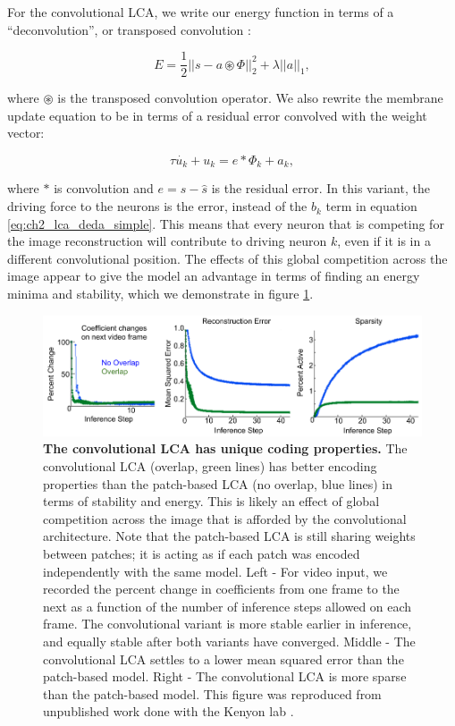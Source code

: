 For the convolutional LCA, we write our energy function in terms of a ``deconvolution'', or transposed convolution \parencite{zeiler2010deconvolutional}:

\begin{equation}
    E = \frac{1}{2} || s - a \circledast \Phi ||^{2}_{2} + \lambda ||a||_{1},
\end{equation}

\noindent where $\circledast$ is the transposed convolution operator. We also rewrite the membrane update equation to be in terms of a residual error convolved with the weight vector:

\begin{equation}\label{eq:ch2_conv_lca_dynamics}
   \tau \dot{u_{k}} + u_{k} = e \ast \Phi_{k} + a_{k},
\end{equation}

\noindent where $\ast$ is convolution and $e = s - \hat{s}$ is the residual error. In this variant, the driving force to the neurons is the error, instead of the $b_{k}$ term in equation \eqref{eq:ch2_lca_deda_simple}. This means that every neuron that is competing for the image reconstruction will contribute to driving neuron $k$, even if it is in a different convolutional position. The effects of this global competition across the image appear to give the model an advantage in terms of finding an energy minima and stability, which we demonstrate in figure \ref{fig:ch2_lca_conv_benefit}.

\begin{figure}[h]
    \centering
    \includegraphics[width=\textwidth]{figures/lca_conv_benefits.png}
    \caption{\textbf{The convolutional LCA has unique coding properties.} The convolutional LCA (overlap, green lines) has better encoding properties than the patch-based LCA (no overlap, blue lines) in terms of stability and energy. This is likely an effect of global competition across the image that is afforded by the convolutional architecture. Note that the patch-based LCA is still sharing weights between patches; it is acting as if each patch was encoded independently with the same model. Left - For video input, we recorded the percent change in coefficients from one frame to the next as a function of the number of inference steps allowed on each frame. The convolutional variant is more stable earlier in inference, and equally stable after both variants have converged. Middle - The convolutional LCA settles to a lower mean squared error than the patch-based model. Right - The convolutional LCA is more sparse than the patch-based model. This figure was reproduced from unpublished work done with the Kenyon lab \parencite{paiton2013deep}.}
    \label{fig:ch2_lca_conv_benefit}   
\end{figure}


